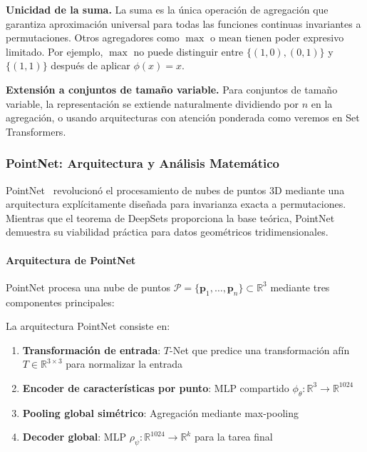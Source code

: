 \textbf{Unicidad de la suma.}\label{rem:uniqueness_sum} La suma es la única operación de agregación que garantiza aproximación universal para todas las funciones continuas invariantes a permutaciones. Otros agregadores como $\max$ o $\text{mean}$ tienen poder expresivo limitado. Por ejemplo, $\max$ no puede distinguir entre $\{(1,0), (0,1)\}$ y $\{(1,1)\}$ después de aplicar $\phi(x) = x$.

\textbf{Extensión a conjuntos de tamaño variable.} Para conjuntos de tamaño variable, la representación se extiende naturalmente dividiendo por $n$ en la agregación, o usando arquitecturas con atención ponderada como veremos en Set Transformers.

\subsubsection{PointNet: Arquitectura y Análisis Matemático}

PointNet~\citep{qi2017pointnet} revolucionó el procesamiento de nubes de puntos 3D mediante una arquitectura explícitamente diseñada para invarianza exacta a permutaciones. Mientras que el teorema de DeepSets proporciona la base teórica, PointNet demuestra su viabilidad práctica para datos geométricos tridimensionales.

\paragraph{Arquitectura de PointNet}

PointNet procesa una nube de puntos $\mathcal{P} = \{\mathbf{p}_1, \ldots, \mathbf{p}_n\} \subset \mathbb{R}^3$ mediante tres componentes principales:

\begin{definition}\label{def:pointnet_architecture}
La arquitectura PointNet consiste en:
\begin{enumerate}
    \item \textbf{Transformación de entrada}: $T$-Net que predice una transformación afín $T \in \mathbb{R}^{3 \times 3}$ para normalizar la entrada
    \item \textbf{Encoder de características por punto}: MLP compartido $\phi_\theta: \mathbb{R}^3 \to \mathbb{R}^{1024}$
    \item \textbf{Pooling global simétrico}: Agregación mediante max-pooling
    \item \textbf{Decoder global}: MLP $\rho_\psi: \mathbb{R}^{1024} \to \mathbb{R}^k$ para la tarea final
\end{enumerate}
\end{definition}


